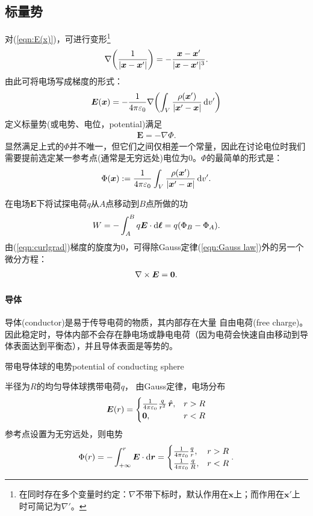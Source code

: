 \subsection{标量势}
对(\ref{eqn:E(x)})，可进行变形\footnote{在同时存在多个变量时约定：$\nabla$不带下标时，默认作用在$\bm x$上；而作用在$\bm x'$上时可简记为$\nabla'$。}
\[
    \nabla\biggl(\frac1{|\bm x-\bm x'|}\biggr)=-\frac{\bm x-\bm x'}{|\bm x-\bm x'|^3}.
\]
由此可将电场写成梯度的形式：
\[
    \bm E(\bm x)=-\frac1{4\pi\varepsilon_0}\nabla\biggl(\int_V\frac{\rho(\bm x')}{|\bm x'-\bm x|}\mathop{}\!\mathrm{d} v'\biggr)
\]
定义标量势(或电势、电位，potential)满足
\begin{align}
    \label{eqn:gradPhi}
    \bm E=-\nabla\Phi.
\end{align}
显然满足上式的$\Phi$并不唯一，但它们之间仅相差一个常量，因此在讨论电位时我们需要提前选定某一参考点(通常是无穷远处)电位为0。$\Phi$的最简单的形式是：
\begin{align}
    \label{eqn:Phi-rho}
    \Phi(\bm x):=\frac1{4\pi\varepsilon_0}\int_V\frac{\rho(\bm x')}{|\bm x'-\bm x|}\mathop{}\!\mathrm{d} v'.
\end{align}

在电场$\bm E$下将试探电荷$q$从$A$点移动到$B$点所做的功
\[
    W=-\int_A^Bq\bm E\cdot\mathop{}\!\mathrm{d}\bm\ell=q(\Phi_B-\Phi_A).
\]
由(\ref{eqn:curlgrad})梯度的旋度为0，可得除Gauss定律(\ref{eqn:Gauss law})外的另一个微分方程：
\begin{align}
    \label{eqn:curlE}
    \nabla\times\bm E=\bm 0.
\end{align}
\paragraph{导体}
导体(conductor)是易于传导电荷的物质，其内部存在大量%
自由电荷(free charge)。因此稳定时，导体内部不会存在静电场或静电电荷（因为电荷会快速自由移动到导体表面达到平衡态），并且导体表面是等势的。
\begin{example}{带电导体球的电势}{potential of conducting sphere}

    半径为$R$的均匀导体球携带电荷$q$，%
    由Gauss定律，电场分布
    \[
        \bm E(r)=
        \begin{cases}
            \frac1{4\pi\varepsilon_0}\frac q{r^2}\mathop{}\!\hat{\bm r},&r>R\\
            \bm 0,&r<R
        \end{cases}
    \]
    参考点设置为无穷远处，则电势
    \[
        \Phi(r)=-\int_{+\infty}^r\bm E\cdot\mathop{}\!\mathrm{d}\bm r=
        \begin{cases}
            \frac1{4\pi\varepsilon_0}\frac qr,&r>R\\
            \frac1{4\pi\varepsilon_0}\frac qR,&r<R
        \end{cases}.
    \]
\end{example}
